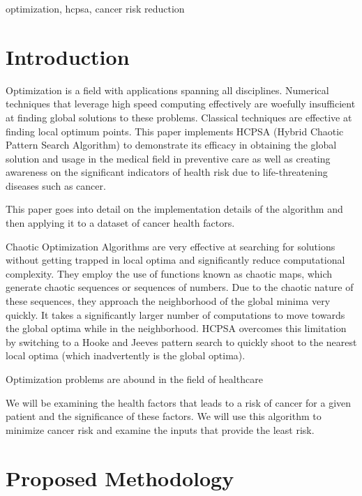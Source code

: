 \documentclass[conference]{IEEEtran}
\begin{document}

\begin{IEEEkeywords}
  optimization, hcpsa, cancer risk reduction
\end{IEEEkeywords}
\section{Introduction}
Optimization is a field with applications spanning all disciplines. Numerical techniques that leverage high speed computing effectively are woefully insufficient at finding global solutions to these problems. Classical techniques are effective at finding local optimum points\cite{LocalConvergencePattern}. This paper implements HCPSA (Hybrid Chaotic Pattern Search Algorithm)\cite{raniAnalysisChaoticMaps2023} to demonstrate its efficacy in obtaining the global solution and usage in the medical field in preventive care as well as creating awareness on the significant indicators of health risk due to life-threatening diseases such as cancer.

This paper goes into detail on the implementation details of the algorithm and then applying it to a dataset of cancer health factors.

Chaotic Optimization Algorithms\cite{yangChaosOptimizationAlgorithms2014} are very effective at searching for solutions without getting trapped in local optima and significantly reduce computational complexity\cite{yangEfficiencyChaosOptimization2007a}. They employ the use of functions known as chaotic maps, which generate chaotic sequences or sequences of numbers. Due to the chaotic nature of these sequences, they approach the neighborhood of the global minima very quickly. It takes a significantly larger number of computations to move towards the global optima while in the neighborhood. HCPSA overcomes this limitation by switching to a Hooke and Jeeves pattern search to quickly shoot to the nearest local optima (which inadvertently is the global optima).

Optimization problems are abound in the field of healthcare \cite{InternationalJournalImaging} \cite{ParticleSwarmOptimization}

We will be examining the health factors that leads to a risk of cancer for a given patient and the significance of these factors. We will use this algorithm to minimize cancer risk and examine the inputs that provide the least risk.

\section{Proposed Methodology}
\end{document}
